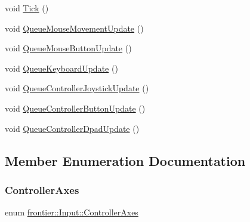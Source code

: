 \begin{DoxyCompactItemize}
\item 
void \hyperlink{classfrontier_1_1_input_ab3d78d816a9ae5ed02c9c91900097149}{Tick} ()
\item 
void \hyperlink{classfrontier_1_1_input_adad2b084e3ddc0ddcf6db9d6f5ebf307}{Queue\+Mouse\+Movement\+Update} ()
\item 
void \hyperlink{classfrontier_1_1_input_a3a78acf75eb63bfcd504b0eca34ce7c2}{Queue\+Mouse\+Button\+Update} ()
\item 
void \hyperlink{classfrontier_1_1_input_ae3e8301699a5ba6d74fe78cab9410230}{Queue\+Keyboard\+Update} ()
\item 
void \hyperlink{classfrontier_1_1_input_adeb3f9c5c6e93ca7406a03314ccfede6}{Queue\+Controller\+Joystick\+Update} ()
\item 
void \hyperlink{classfrontier_1_1_input_aef3fb33e53dfad959d197f07dd3811ce}{Queue\+Controller\+Button\+Update} ()
\item 
void \hyperlink{classfrontier_1_1_input_a99b2f7b890ffeb5f1079a57af7945892}{Queue\+Controller\+Dpad\+Update} ()
\end{DoxyCompactItemize}


\subsection{Member Enumeration Documentation}
\mbox{\label{classfrontier_1_1_input_aa34e103eba0f13faf437863692310859}} 
\subsubsection{\texorpdfstring{Controller\+Axes}{ControllerAxes}}
{\footnotesize\ttfamily enum \hyperlink{classfrontier_1_1_input_aa34e103eba0f13faf437863692310859}{frontier\+::\+Input\+::\+Controller\+Axes}}

